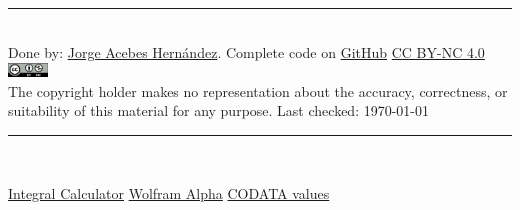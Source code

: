 \hrule
~\\
Done by: \href{https://www.linkedin.com/in/jorge-acebes-hern%C3%A1ndez/}{Jorge Acebes Hernández}. Complete code on \href{https://github.com/JorgeAcebes/Math_For_Physics_CheatSheet}{GitHub} 
\; \; \;\; \href{https://creativecommons.org/licenses/by-nc/4.0/}{CC BY-NC 4.0}
\;\;\;\; \includegraphics[height=1em]{sections/ccbync.png}\\
The copyright holder makes no representation about the accuracy, correctness, or suitability of
this material for any purpose. Last checked: \today
\vfill
\hrule
~\\
\begin{centering}
\href{https://www.integral-calculator.com/}{Integral Calculator} \;\;
\href{https://www.wolframalpha.com/}{Wolfram Alpha}\;\;
\href{https://physics.nist.gov/cuu/Constants/index.html}{CODATA values}

\end{centering}




